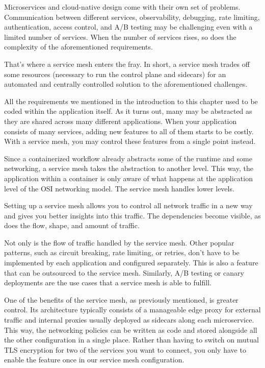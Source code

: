 
Microservices and cloud-native design come with their own set of problems. Communication between different services, observability, debugging, rate limiting, authentication, access control, and A/B testing may be challenging even with a limited number of services. When the number of services rises, so does the complexity of the aforementioned requirements.

That's where a service mesh enters the fray. In short, a service mesh trades off some resources (necessary to run the control plane and sidecars) for an automated and centrally controlled solution to the aforementioned challenges.


All the requirements we mentioned in the introduction to this chapter used to be coded within the application itself. As it turns out, many may be abstracted as they are shared across many different applications. When your application consists of many services, adding new features to all of them starts to be costly. With a service mesh, you may control these features from a single point instead.

Since a containerized workflow already abstracts some of the runtime and some networking, a service mesh takes the abstraction to another level. This way, the application within a container is only aware of what happens at the application level of the OSI networking model. The service mesh handles lower levels.

Setting up a service mesh allows you to control all network traffic in a new way and gives you better insights into this traffic. The dependencies become visible, as does the flow, shape, and amount of traffic.

Not only is the flow of traffic handled by the service mesh. Other popular patterns, such as circuit breaking, rate limiting, or retries, don't have to be implemented by each application and configured separately. This is also a feature that can be outsourced to the service mesh. Similarly, A/B testing or canary deployments are the use cases that a service mesh is able to fulfill.

One of the benefits of the service mesh, as previously mentioned, is greater control. Its architecture typically consists of a manageable edge proxy for external traffic and internal proxies usually deployed as sidecars along each microservice. This way, the networking policies can be written as code and stored alongside all the other configuration in a single place. Rather than having to switch on mutual TLS encryption for two of the services you want to connect, you only have to enable the feature once in our service mesh configuration.

